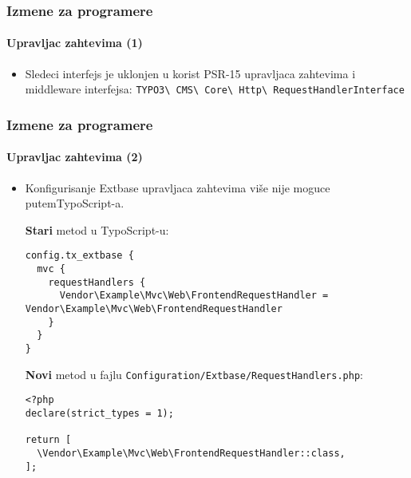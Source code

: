 
\begin{frame}[fragile]
	\frametitle{Izmene za programere}
	\framesubtitle{Upravljac zahtevima (1)}

	\begin{itemize}
		\item Sledeci interfejs je uklonjen u korist PSR-15 upravljaca zahtevima i middleware interfejsa:\newline
			\texttt{TYPO3\textbackslash
				CMS\textbackslash
				Core\textbackslash
				Http\textbackslash
				RequestHandlerInterface}

	\end{itemize}

\end{frame}


\begin{frame}[fragile]
	\frametitle{Izmene za programere}
	\framesubtitle{Upravljac zahtevima (2)}

	\lstset{basicstyle=\tiny\ttfamily}

	\begin{itemize}
		\item Konfigurisanje Extbase upravljaca zahtevima više nije moguce putemTypoScript-a.

		\smaller\textbf{Stari} metod u TypoScript-u:\normalsize
\begin{lstlisting}
config.tx_extbase {
  mvc {
    requestHandlers {
      Vendor\Example\Mvc\Web\FrontendRequestHandler = Vendor\Example\Mvc\Web\FrontendRequestHandler
    }
  }
}
\end{lstlisting}

		\smaller\textbf{Novi} metod u fajlu \texttt{Configuration/Extbase/RequestHandlers.php}:\normalsize
\begin{lstlisting}
<?php
declare(strict_types = 1);

return [
  \Vendor\Example\Mvc\Web\FrontendRequestHandler::class,
];
\end{lstlisting}

	\end{itemize}

\end{frame}


